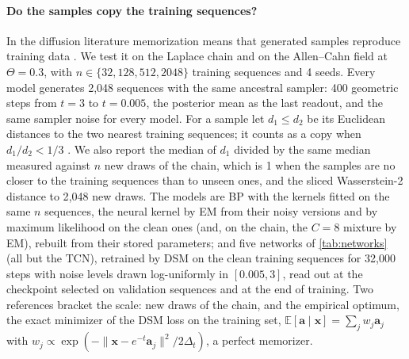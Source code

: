 \documentclass{article}
\begin{document}
\paragraph{Do the samples copy the training sequences?}
\label{app:memorization-gen}
In the diffusion literature memorization means that generated samples reproduce training data
\cite{gu2023memorization}. We test it on the Laplace chain and on the Allen--Cahn field at $\Theta=0.3$, with
$n\in\{32,128,512,2048\}$ training sequences and 4 seeds. Every model generates 2{,}048 sequences with the same
ancestral sampler: 400 geometric steps from $t=3$ to $t=0.005$, the posterior mean as the last readout, and the same
sampler noise for every model. For a sample let $d_1\le d_2$ be its Euclidean distances to the two nearest training
sequences; it counts as a copy when $d_1/d_2<1/3$ \cite{gu2023memorization}. We also report the median of $d_1$
divided by the same median measured against $n$ new draws of the chain, which is 1 when the samples are no closer to
the training sequences than to unseen ones, and the sliced Wasserstein-2 distance to 2{,}048 new draws. The models are
BP with the kernels fitted on the same $n$ sequences, the neural kernel by EM from their noisy versions and by maximum
likelihood on the clean ones (and, on the chain, the $C=8$ mixture by EM), rebuilt from their stored parameters; and
five networks of \cref{tab:networks} (all but the TCN), retrained by DSM on the clean training sequences for
32{,}000 steps with noise levels drawn log-uniformly in $[0.005,3]$, read out at the checkpoint selected on validation
sequences and at the end of training. Two references bracket the scale: new draws of the chain, and the empirical
optimum, the exact minimizer of the DSM loss on the training set, $\mathbb E[\mathbf a\mid\mathbf x]=\sum_j
w_j\mathbf a_j$ with $w_j\propto\exp(-\|\mathbf x-e^{-t}\mathbf a_j\|^2/2\Delta_t)$, a perfect memorizer.
\end{document}

